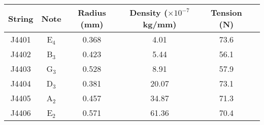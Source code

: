 \begin{tabular}{cccccc}
\toprule
String & Note & Radius (mm) & Density ($\times 10^{-7}$ kg/mm) & Tension (N) \\
\midrule
J4401 & E$_{4}$ & 0.368 & 4.01 & 73.6 \\
J4402 & B$_{3}$ & 0.423 & 5.44 & 56.1 \\
J4403 & G$_{3}$ & 0.528 & 8.91 & 57.9 \\
J4404 & D$_{3}$ & 0.381 & 20.07 & 73.1 \\
J4405 & A$_{2}$ & 0.457 & 34.87 & 71.3 \\
J4406 & E$_{2}$ & 0.571 & 61.36 & 70.4 \\
\bottomrule
\end{tabular}


